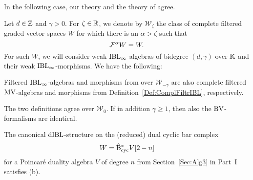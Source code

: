 \documentclass[\MainFolder/Text.tex]{subfiles}
\begin{document}
In the following case, our theory and the theory of \cite{Cieliebak2015} agree.

\begin{Proposition}\label{Prop:BVforIBL}
Let $d\in \mathbb{Z}$ and $\gamma>0$. For $\zeta\in \mathbb{R}$, we denote by $\mathcal{W}_\zeta$ the class of complete filtered graded vector spaces $W$ for which there is an $\alpha>\zeta$ such that
\begin{equation}\label{Eq:FiltrCondU}
 \mathcal{F}^{\alpha} W = W.
\end{equation}
For such $W$, we will consider weak $\mathrm{IBL}_\infty$-algebras of bidegree $(d,\gamma)$ over $\mathbb{K}$ and their weak $\mathrm{IBL}_\infty$-morphisms. We have the following:
\begin{ClaimList}
\item Filtered $\mathrm{IBL}_\infty$-algebras and morphisms from \cite{Cieliebak2015} over $\mathcal{W}_{-\gamma}$ are also complete filtered $\mathrm{MV}$-algebras and morphisms from Definition~\ref{Def:ComplFiltrIBL}, respectively.
\item The two definitions agree over $\mathcal{W}_0$. If in addition $\gamma\ge 1$, then also the $\mathrm{BV}$-formalisms are identical.
\item The canonical $\mathrm{dIBL}$-structure on the (reduced) dual cyclic bar complex 
\[W = \hat{\mathrm{B}}_{\mathrm{cyc}}^* V[2-n]\]
for a Poincar\'e duality algebra $V$ of degree $n$ from Section~\ref{Sec:Alg3} in Part~I satisfies (b).
\end{ClaimList}
%
\end{Proposition}
\end{document}
